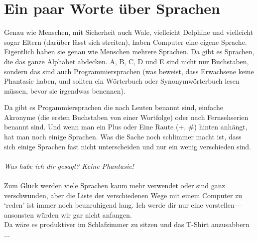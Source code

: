 \section{Ein paar Worte über Sprachen}

Genau wie Menschen, mit Sicherheit auch Wale, vielleicht Delphine und vielleicht sogar Eltern (darüber lässt sich streiten), haben Computer eine eigene Sprache. Eigentlich haben sie genau wie Menschen mehrere Sprachen. Da gibt es Sprachen, die das ganze Alphabet abdecken. A, B, C, D und E sind nicht nur Buchstaben, sondern das sind auch Programmiersprachen (was beweist, dass Erwachsene keine Phantasie haben, und sollten ein Wörterbuch oder Synonymwörterbuch lesen müssen, bevor sie irgendwas benennen).

Da gibt es Progammiersprachen die nach Leuten benannt sind, einfache Akronyme (die ersten Buchstaben von einer Wortfolge) oder nach Fernsehserien benannt sind. Und wenn man ein Plus oder Eine Raute (+, \#) hinten anhängt, hat man noch einige Sprachen. Was die Sache noch schlimmer macht ist, dass sich einige Sprachen fast nicht unterscheiden und nur ein wenig verschieden sind.
\\
\\
\emph{Was habe ich dir gesagt? Keine Phantasie!}
\\
\\
Zum Glück werden viele Sprachen kaum mehr verwendet oder sind ganz verschwunden, aber die Liste der verschiedenen Wege mit einem Computer zu `reden' ist immer noch beunruhigend lang. Ich werde dir nur eine vorstellen---ansonsten würden wir gar nicht anfangen.
\\
Da wäre es produktiver im Schlafzimmer zu sitzen und das T-Shirt anzusabbern$\ldots$

